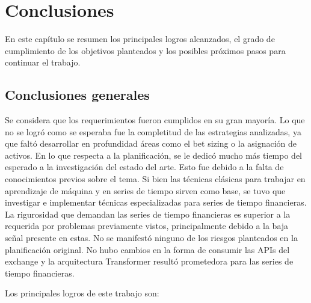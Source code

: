 
\chapter{Conclusiones} %

\label{Chapter5} %

En este capítulo se resumen los principales logros alcanzados, el grado de cumplimiento de los objetivos planteados y los posibles próximos pasos para continuar el trabajo.




\section{Conclusiones generales }

Se considera que los requerimientos fueron cumplidos en su gran mayoría. Lo que no se logró como se esperaba fue la completitud de las estrategias analizadas, ya que faltó desarrollar en profundidad áreas como el bet sizing o la asignación de activos.
En lo que respecta a la planificación, se le dedicó mucho más tiempo del esperado a la investigación del estado del arte. Esto fue debido a la falta de conocimientos previos sobre el tema.
Si bien las técnicas clásicas para trabajar en aprendizaje de máquina y en series de tiempo sirven como base, se tuvo que investigar e implementar técnicas especializadas para series de tiempo financieras. La rigurosidad que demandan las series de tiempo financieras es superior a la requerida por problemas previamente vistos, principalmente debido a la baja señal presente en estas.
No se manifestó ninguno de los riesgos planteados en la planificación original. No hubo cambios en la forma de consumir las APIs del exchange y la arquitectura Transformer resultó prometedora para las series de tiempo financieras.

Los principales logros de este trabajo son:

